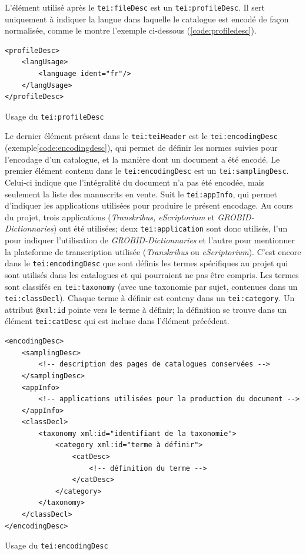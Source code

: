 L'élément utilisé après le \texttt{tei:fileDesc} est un \texttt{tei:profileDesc}. Il sert uniquement à indiquer la langue dans laquelle le catalogue est encodé de façon normalisée, comme le montre l'exemple ci-dessous (\ref{code:profiledesc}).

\begin{listing}[h]
	\begin{verbatim}
<profileDesc>
	<langUsage>
		<language ident="fr"/>
	</langUsage>
</profileDesc>
	\end{verbatim}
	\caption{Usage du \texttt{tei:profileDesc}}
	\label{code:profiledesc}
\end{listing}

Le dernier élément présent dans le \texttt{tei:teiHeader} est le \texttt{tei:encodingDesc} (exemple\ref{code:encodingdesc}), qui permet de définir les normes suivies pour l'encodage d'un catalogue, et la manière dont un document a été encodé. Le premier élément contenu dans le \texttt{tei:encodingDesc} est un \texttt{tei:samplingDesc}. Celui-ci indique que l'intégralité du document n'a pas été encodée, mais seulement la liste des manuscrits en vente. Suit le \texttt{tei:appInfo}, qui permet d'indiquer les applications utilisées pour produire le présent encodage. Au cours du projet, trois applications (\textit{Transkribus, eScriptorium} et \textit{GROBID-Dictionnaries}) ont été utilisées; deux \texttt{tei:application} sont donc utilisés, l'un pour indiquer l'utilisation de \textit{GROBID-Dictionnaries} et l'autre pour mentionner la plateforme de transcription utilisée (\textit{Transkribus} ou \textit{eScriptorium}). C'est encore dans le \texttt{tei:encodingDesc} que sont définis les termes spécifiques au projet qui sont utilisés dans les catalogues et qui pourraient ne pas être compris. Les termes sont classifés en \texttt{tei:taxonomy} (avec une taxonomie par sujet, contenues dans un \texttt{tei:classDecl}). Chaque terme à définir est conteny dans un \texttt{tei:category}. Un attribut \texttt{@xml:id} pointe vers le terme à définir; la définition se trouve dans un élément \texttt{tei:catDesc} qui est incluse dans l'élément précédent.

\begin{listing}[h]
	\begin{verbatim}
<encodingDesc>
	<samplingDesc>
		<!-- description des pages de catalogues conservées -->
	</samplingDesc>
	<appInfo>
		<!-- applications utilisées pour la production du document -->
	</appInfo>
	<classDecl>
		<taxonomy xml:id="identifiant de la taxonomie">
			<category xml:id="terme à définir">
				<catDesc>
					<!-- définition du terme -->
				</catDesc>
			</category>
		</taxonomy>
	</classDecl>
</encodingDesc>
	\end{verbatim}
	\caption{Usage du \texttt{tei:encodingDesc}}
	\label{code:encodingdesc}
\end{listing}

